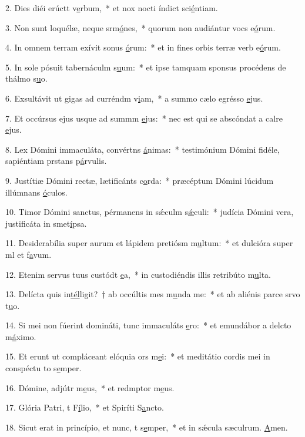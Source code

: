 2. Dies diéi erúctt v\uline{e}rbum,~* et nox nocti índict sci\uline{é}ntiam.\par 
3. Non sunt loquélæ, neque srm\uline{ó}nes,~* quorum non audiántur vocs e\uline{ó}rum.\par 
4. In omnem terram exívit sonus \uline{ó}rum:~* et in fines orbis terræ verb e\uline{ó}rum.\par 
5. In sole pósuit tabernáculm s\uline{u}um:~* et ipse tamquam sponsus procédens de thálmo s\uline{u}o.\par 
6. Exsultávit ut gigas ad curréndm v\uline{i}am,~* a summo cælo egrésso \uline{e}jus.\par 
7. Et occúrsus ejus usque ad summm \uline{e}jus:~* nec est qui se abscóndat a calre \uline{e}jus.\par 
8. Lex Dómini immaculáta, convértns \uline{á}nimas:~* testimónium Dómini fidéle, sapiéntiam prstans p\uline{á}rvulis.\par 
9. Justítiæ Dómini rectæ, lætificánts c\uline{o}rda:~* præcéptum Dómini lúcidum illúmnans \uline{ó}culos.\par 
10. Timor Dómini sanctus, pérmanens in sǽculm s\uline{ǽ}culi:~* judícia Dómini vera, justificáta in smet\uline{í}psa.\par 
11. Desiderabília super aurum et lápidem pretiósm m\uline{u}ltum:~* et dulcióra super ml et f\uline{a}vum.\par 
12. Etenim servus tuus custódt \uline{e}a,~* in custodiéndis illis retribúto m\uline{u}lta.\par 
13. Delícta quis in\uline{tél}ligit?~† ab occúltis mes m\uline{u}nda me:~* et ab aliénis parce srvo t\uline{u}o.\par 
14. Si mei non fúerint domináti, tunc immaculáts \uline{e}ro:~* et emundábor a delcto m\uline{á}ximo.\par 
15. Et erunt ut compláceant elóquia ors m\uline{e}i:~* et meditátio cordis mei in conspéctu to s\uline{e}mper.\par 
16. Dómine, adjútr m\uline{e}us,~* et redmptor m\uline{e}us.\par 
17. Glória Patri, t F\uline{í}lio,~* et Spiríti S\uline{a}ncto.\par 
18. Sicut erat in princípio, et nunc, t s\uline{e}mper,~* et in sǽcula sæculrum. \uline{A}men.\par 
